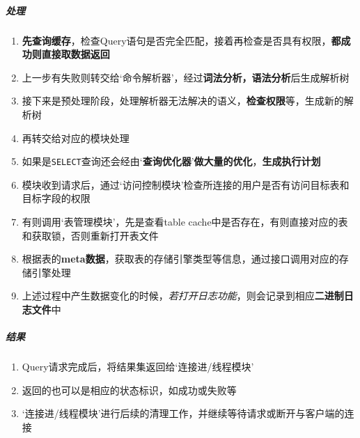 \documentclass[UTF8,a4paper,12pt]{ctexbook}
\begin{document}
			\subparagraph{处理}
				\begin{enumerate}[itemindent = 2em]
					\item \textbf{先查询缓存}，检查Query语句是否完全匹配，接着再检查是否具有权限，\textbf{都成功则直接取数据返回}
					\item 上一步有失败则转交给‘命令解析器’，经过\textbf{词法分析，语法分析}后生成解析树
					\item 接下来是预处理阶段，处理解析器无法解决的语义，\textbf{检查权限}等，生成新的解析树
					\item 再转交给对应的模块处理
					\item 如果是\verb|SELECT|查询还会经由‘\textbf{查询优化器}’\textbf{做大量的优化}，\textbf{生成执行计划}
					\item 模块收到请求后，通过‘访问控制模块’检查所连接的用户是否有访问目标表和目标字段的权限
					\item 有则调用‘表管理模块’，先是查看table cache中是否存在，有则直接对应的表和获取锁，否则重新打开表文件
					\item 根据表的\textbf{meta数据}，获取表的存储引擎类型等信息，通过接口调用对应的存储引擎处理
					\item 上述过程中产生数据变化的时候，\textit{若打开日志功能}，则会记录到相应\textbf{二进制日志文件}中
				\end{enumerate}
			
			\subparagraph{结果}
				\begin{enumerate}[itemindent = 2em]
					\item Query请求完成后，将结果集返回给‘连接进/线程模块’
					\item 返回的也可以是相应的状态标识，如成功或失败等
					\item ‘连接进/线程模块’进行后续的清理工作，并继续等待请求或断开与客户端的连接
				\end{enumerate}
				
\end{document}
